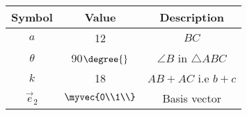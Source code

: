 \begin{tabular}{|c|c|c|}
  \hline
  \textbf{Symbol}&\textbf{Value}&\textbf{Description}\\
  \hline
  $a$ & 12 & $BC$\\
  \hline
  $\theta$ & 90$\degree{}$ & $\angle{B}$ in $\triangle ABC$ \\
  \hline
  $k$ & 18 & $AB+AC$ i.e $b+c$ \\
  \hline 
  $\vec{e}_2$ & $\myvec{0\\1\\}$ & Basis vector\\
  \hline   
\end{tabular}\\
